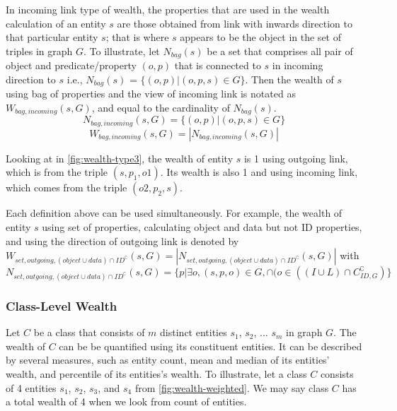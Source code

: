 In incoming link type of wealth, the properties that are used in the wealth calculation of an entity \(s\) are those obtained from link with inwards direction to that particular entity \(s\); that is where \(s\) appears to be the object in the set of triples in graph \(G\). To illustrate, let \(N_{bag}(s)\) be a set that comprises all pair of object and predicate/property \((o,p)\) that is connected to \(s\) in incoming direction to \(s\) i.e., \(N_{bag}(s)\) = \(\{(o, p) | (o, p, s) \in G\}\). Then the wealth of \(s\) using bag of properties and the view of incoming link is notated as \(W_{bag, incoming}(s, G)\), and equal to the cardinality of \(N_{bag}(s)\).
\[
    N_{bag, incoming}(s, G) = \{(o,p) | (o, p, s) \in G\}
\]
\[
    W_{bag, incoming}(s, G) = |N_{bag, incoming}(s, G)|
\]

Looking at in \autoref{fig:wealth-type3}, the wealth of entity \(s\) is 1 using outgoing link, which is from the triple \((s, p_1, o1)\). Its wealth is also 1 and using incoming link, which comes from the triple \((o2, p_2, s)\).

Each definition above can be used simultaneously. For example, the wealth of entity \(s\) using set of properties, calculating object and data but not ID properties, and using the direction of outgoing link is denoted by \(W_{set, outgoing, (object \cup data) \cap ID^\complement}(s, G) = |N_{set, outgoing, (object \cup data) \cap ID^\complement}(s, G)|\) with \(N_{set, outgoing, (object \cup data) \cap ID^\complement}(s, G) = \{p | \exists o, (s, p, o) \in G, \cap (o \in ((I \cup L) \cap C_{ID,G}^\complement)\}\)

\subsubsection{Class-Level Wealth}
Let \(C\) be a class that consists of \(m\) distinct entities \(s_1\), \(s_2\), ... \(s_m\) in graph \(G\). The wealth of \(C\) can be be quantified using its constituent entities. It can be described by several measures, such as entity count, mean and median of its entities' wealth, and percentile of its entities's wealth. To illustrate, let a class \(C\) consists of 4 entities  \(s_1\), \(s_2\), \(s_3\), and \(s_4\) from \autoref{fig:wealth-weighted}. We may say class \(C\) has a total wealth of 4 when we look from count of entities.